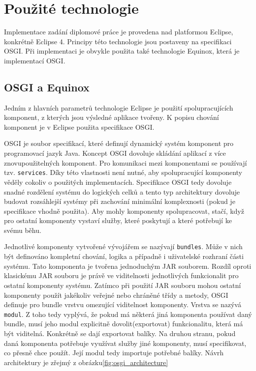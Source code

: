\documentclass[ing,male,java,dept460]{diploma}		%
\begin{document}
\section{Použité technologie}
Implementace zadání diplomové práce je provedena nad platformou Eclipse, konkrétně Eclipse 4. Principy této technologie jsou postaveny na specifikaci OSGI. Při implementaci je obvykle použita také technologie Equinox, která je implementací OSGI.
\subsection{OSGI a Equinox}
Jedním z hlavních parametrů technologie Eclipse je použití spolupracujících komponent, z kterých jsou výsledné aplikace tvořeny. K popisu chování komponent je v Eclipse použita specifikace OSGI.
\par OSGI je soubor specifikací, které definují dynamický systém komponent pro programovací jazyk Java. Koncept OSGI dovoluje skládání aplikací z více znovupoužitelných komponent. Pro komunikaci mezi komponentami se používají tzv. \texttt{services}. Díky této vlastnosti není nutné, aby spolupracující komponenty věděly cokoliv o použitých implementacích. Specifikace OSGI tedy dovoluje snadné rozdělení systému do logických celků a tento typ architektury dovoluje budovat rozsáhlejší systémy při zachování minimální komplexnosti (pokud je specifikace vhodně použita). Aby mohly komponenty spolupracovat, stačí, když pro ostatní komponenty vystaví služby, které poskytují a které potřebují ke svému běhu.
\par Jednotlivé komponenty vytvořené vývojářem se nazývají \texttt{bundles}. Může v nich být definováno kompletní chování, logika a případně i uživatelské rozhraní části systému. Tato komponenta je tvořena jednoduchým JAR souborem. Rozdíl oproti klasickému JAR souboru je právě ve viditelnosti jednotlivých funkcionalit pro ostatní komponenty systému. Zatímco při použití JAR souboru mohou ostatní komponenty použít jakékoliv veřejné nebo chráněné třídy a metody, OSGI definuje pro bundle vrstvu omezující viditelnost komponenty. Vrstva se nazývá \texttt{modul}. Z toho tedy vyplývá, že pokud má některá jiná komponenta používat daný bundle, musí jeho modul explicitně dovolit(exportovat) funkcionalitu, která má být viditelná. Konkrétně se dají exportovat balíky. Na druhou stranu, pokud daná komponenta potřebuje využívat služby jiné komponenty, musí specifikovat, co přesně chce použít. Její modul tedy importuje potřebné balíky. Návrh architektury je zřejmý z obrázku\ref{fig:osgi_architecture}
\end{document}
